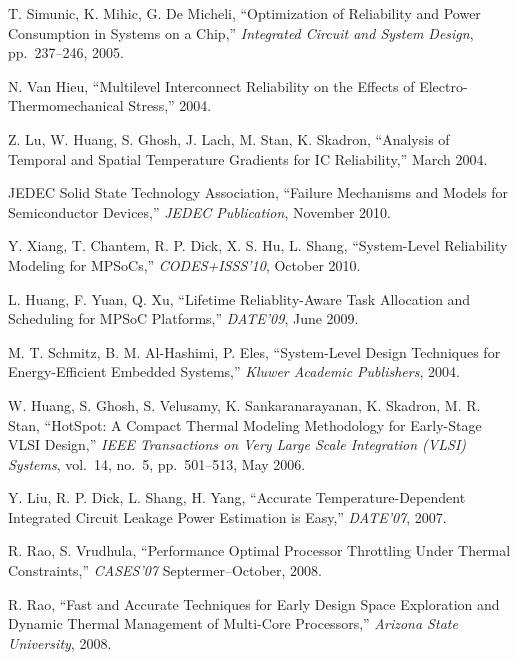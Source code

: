 \begin{thebibliography}{99}
    T. Simunic, K. Mihic, G. De Micheli,
    ``Optimization of Reliability and Power Consumption in Systems on a Chip,''
    \emph{Integrated Circuit and System Design},
    pp.~237--246, 2005.

    N. Van Hieu,
    ``Multilevel Interconnect Reliability on the Effects of Electro-Thermomechanical Stress,''
    2004.

    Z. Lu, W. Huang, S. Ghosh, J. Lach, M. Stan, K. Skadron,
    ``Analysis of Temporal and Spatial Temperature Gradients for IC Reliability,''
    March 2004.

    JEDEC Solid State Technology Association,
    ``Failure Mechanisms and Models for Semiconductor Devices,''
    \emph{JEDEC Publication},
    November 2010.

    Y. Xiang, T. Chantem, R. P. Dick, X. S. Hu, L. Shang,
    ``System-Level Reliability Modeling for MPSoCs,''
    \emph{CODES+ISSS'10},
    October 2010.

    L. Huang, F. Yuan, Q. Xu,
    ``Lifetime Reliablity-Aware Task Allocation and Scheduling for MPSoC Platforms,''
    \emph{DATE'09},
    June 2009.

    M. T. Schmitz, B. M. Al-Hashimi, P. Eles,
    ``System-Level Design Techniques for Energy-Efficient Embedded Systems,''
    \emph{Kluwer Academic Publishers},
    2004.

    W. Huang, S. Ghosh, S. Velusamy, K. Sankaranarayanan, K. Skadron, M. R. Stan,
    ``HotSpot: A Compact Thermal Modeling Methodology for Early-Stage VLSI Design,''
    \emph{IEEE Transactions on Very Large Scale Integration (VLSI) Systems},
    vol.~14, no.~5, pp.~501--513, May 2006.

    Y. Liu, R. P. Dick, L. Shang, H. Yang,
    ``Accurate Temperature-Dependent Integrated Circuit Leakage Power Estimation is Easy,''
    \emph{DATE'07},
    2007.

    R. Rao, S. Vrudhula,
    ``Performance Optimal Processor Throttling Under Thermal Constraints,''
    \emph{CASES'07}
    Septermer--October, 2008.

    R. Rao,
    ``Fast and Accurate Techniques for Early Design Space Exploration and Dynamic Thermal Management of Multi-Core Processors,''
    \emph{Arizona State University},
    2008.


\end{thebibliography}

